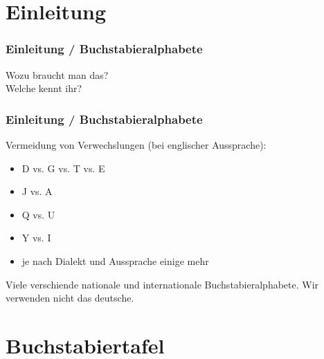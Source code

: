 

\subtitle{Betriebstechnik/Vorschriften 02:         \\
  Das ``Internationale Buchstabieralphabet'' \\[2em]}
\date{Stand 18.09.2017}


\section*{Einleitung}

\begin{frame}
  \frametitle{Einleitung / Buchstabieralphabete}
  \begin{center}
    \Large{Wozu braucht man das?} \\
    \Large{Welche kennt ihr?}
  \end{center}
\end{frame}

\begin{frame}
  \frametitle{Einleitung / Buchstabieralphabete}

  Vermeidung von Verwechslungen (bei englischer Aussprache):

  \begin{itemize}
    \item D vs. G vs. T vs. E
    \item J vs. A
    \item Q vs. U
    \item Y vs. I
    \item je nach Dialekt und Aussprache einige mehr
  \end{itemize}

  Viele verschiende nationale und internationale Buchstabieralphabete. Wir
  verwenden nicht das deutsche.

\end{frame}

\section*{Buch\-stabier\-tafel}

